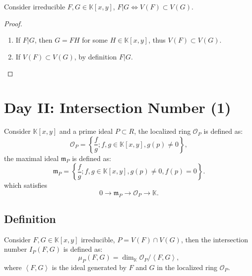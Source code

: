 \documentclass[10pt]{article}
\begin{document}
\begin{theorem}
  Consider irreducible $ F, G \in \mathbb{K}[x,y]$, $ F | G \Leftrightarrow V(F) \subset V(G)$.
\end{theorem}
\begin{proof}
  \begin{enumerate}[(1)]
    \item If $ F | G$, then $ G = F H$ for some $ H \in \mathbb{K}[x,y]$, thus $ V(F) \subset V(G)$.
    \item If $ V(F) \subset V(G)$, by definition $ F | G$.
  \end{enumerate}
\end{proof}

\section{Day II: Intersection Number (1)}

\begin{definition}
  Consider $ \mathbb{K}[x,y]$ and a prime ideal $ P \subset R$, the localized ring $ \mathcal{O}_P$ is defined as:
  \begin{equation*}
    \mathcal{O}_P = \left\{ \frac{f}{g} ; f, g \in \mathbb{K}[x,y] , g(p) \neq 0 \right\},
  \end{equation*}
  the maximal ideal $ \mathfrak{m}_P$ is defined as:
  \begin{equation*}
    \mathfrak{m}_P = \left\{ \frac{f}{g} ; f,g \in \mathbb{K}[x,y] , g(p) \neq 0 , f(p) = 0\right\}.
  \end{equation*}
  which satisfies
  \begin{equation*}
    0 \rightarrow \mathfrak{m}_P \rightarrow \mathcal{O}_P \rightarrow \mathbb{K}.
  \end{equation*}
\end{definition}

\subsection{Definition}

\begin{definition}
  Consider $ F, G \in \mathbb{K}[x,y]$ irreducible, $ P = V(F) \cap V(G)$, then the intersection number $ I_P(F,G)$ is defined as:
  \begin{equation*}
    \mu_{P}(F,G) = \dim_{\mathbb{K}} \mathcal{O}_P / \left< F,G \right>,
  \end{equation*}
  where $\left< F,G \right>$ is the ideal generated by $ F$ and $ G$ in the localized ring $ \mathcal{O}_P$.
\end{definition}
\end{document}
